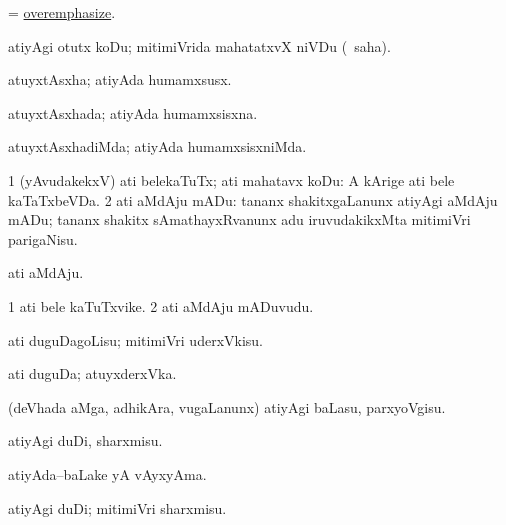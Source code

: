 \bentry
{}
\gl{\kirx}
\bmng
= \hyperlink{overemphasize}{overemphasize}. 
\emng
\eentry

\bentry
{}
\gl{\sakirx}
\bmng
atiyAgi otutx koDu; mitimiVrida mahatatxvX niVDu (\akirx\ saha). 
\emng
\eentry

\bentry
{}
\gl{\nA}
\bmng
atuyxtAsxha; atiyAda humamxsusx. 
\emng
\eentry

\bentry
{}
\gl{\gu}
\bmng
atuyxtAsxhada; atiyAda humamxsisxna. 
\emng
\eentry

\bentry
{}
\gl{\kirxvi}
\bmng
atuyxtAsxhadiMda; atiyAda humamxsisxniMda. 
\emng
\eentry

\bentry
{}
\gl{\sakirx}
\bmng
\bnum
\num{1} (yAvudakekxV) ati belekaTuTx; ati mahatavx koDu:  A kArige ati bele kaTaTxbeVDa. 
\num{2} ati aMdAju mADu:  tananx shakitxgaLanunx atiyAgi aMdAju mADu; tananx shakitx sAmathayxRvanunx adu iruvudakikxMta mitimiVri parigaNisu. 
\enum
\emng
\eentry

\bentry
{}
\gl{\nA}
\bmng
ati aMdAju. 
\emng
\eentry

\bentry
{}
\gl{\nA}
\bmng
\bnum
\num{1} ati bele kaTuTxvike. 
\num{2} ati aMdAju mADuvudu. 
\enum
\emng
\eentry

\bentry
{}
\gl{\sakirx}
\bmng
ati duguDagoLisu; mitimiVri uderxVkisu. 
\emng
\eentry

\bentry
{}
\gl{\nA}
\bmng
ati duguDa; atuyxderxVka. 
\emng
\eentry

\bentry
{}
\gl{\sakirx}
\bmng
(deVhada aMga, adhikAra, \mo vugaLanunx) atiyAgi baLasu, parxyoVgisu. 
\emng

\noindent
\gl{\akirx}
\bmng
atiyAgi duDi, sharxmisu. 
\emng
\eentry

\bentry
{}
\gl{\nA}
\bmng
atiyAda--baLake yA vAyxyAma. 
\emng
\eentry

\bentry
{}
\gl{\sakirx}
\bmng
atiyAgi duDi; mitimiVri sharxmisu. 
\emng
\eentry


